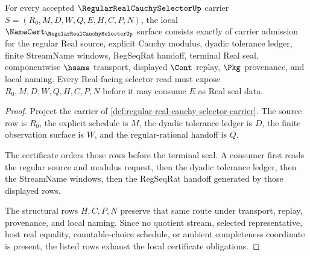 \begin{theorem}
\label{thm:regular-real-cauchy-selector-namecert-obligations}
For every accepted $\RegularRealCauchySelectorUp$ carrier $S=(R_0,M,D,W,Q,E,H,C,P,N)$, the local $\NameCert_{\RegularRealCauchySelectorUp}$ surface consists exactly of carrier admission for the regular Real source, explicit Cauchy modulus, dyadic tolerance ledger, finite StreamName windows, RegSeqRat handoff, terminal Real seal, componentwise $\hsame$ transport, displayed $\Cont$ replay, $\Pkg$ provenance, and local naming. Every Real-facing selector read must expose $R_0,M,D,W,Q,H,C,P,N$ before it may consume $E$ as Real seal data.
\end{theorem}
\begin{proof}
Project the carrier of \autoref{def:regular-real-cauchy-selector-carrier}. The source row is $R_0$, the explicit schedule is $M$, the dyadic tolerance ledger is $D$, the finite observation surface is $W$, and the regular-rational handoff is $Q$.

The certificate orders those rows before the terminal seal. A consumer first reads the regular source and modulus request, then the dyadic tolerance ledger, then the StreamName windows, then the RegSeqRat handoff generated by those displayed rows.

The structural rows $H,C,P,N$ preserve that same route under transport, replay, provenance, and local naming. Since no quotient stream, selected representative, host real equality, countable-choice schedule, or ambient completeness coordinate is present, the listed rows exhaust the local certificate obligations.
\end{proof}

